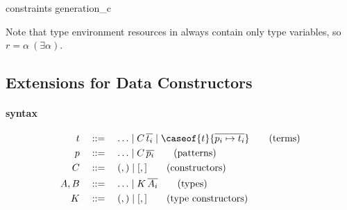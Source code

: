 \begin{rules}{\vlmini{} constraints generation}{\Sigma \vdash [\Gamma] \sqsubseteq_{c}  \rhd {}}
    \begin{minipage}{.35\linewidth}
    \end{minipage}
    \begin{minipage}{.60\linewidth}
    \end{minipage}
\end{rules}
\vspace{\baselineskip}
Note that type environment resources in \vlmini{} always contain only type variables, so $r = \alpha~(\exists\alpha)$.




\subsection{Extensions for Data Constructors}
\label{appendix:vlmini_data_structures}
\paragraph{\textnormal{\textbf{\vlmini{} syntax}}}
\begin{align*}
t \quad&::=\quad \ldots \mid C\,\overline{t_i} \mid \caseof{t}{\overline{p_i \mapsto t_i}}\tag{terms}\\
p \quad&::=\quad \ldots \mid C\,\overline{p_i} \tag{patterns}\\
C \quad&::=\quad (,) \mid [,] \tag{constructors}\\
A, B \quad&::=\quad \ldots \mid K\,\overline{A_i} \tag{types}\\
K    \quad&::=\quad (,) \mid [,] \tag{type constructors}
\end{align*}

